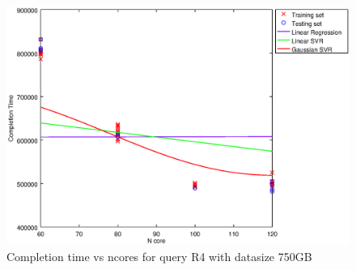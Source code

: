 
\begin {figure}[hbtp]
\centering
\includegraphics[width=\textwidth]{output/R4_750_LINEAR_NCORE/plot_R4_750_bestmodels.eps}
\caption{Completion time vs ncores for query R4 with datasize 750GB}
\label{fig:coreonly_linear_R4_750}
\end {figure}
